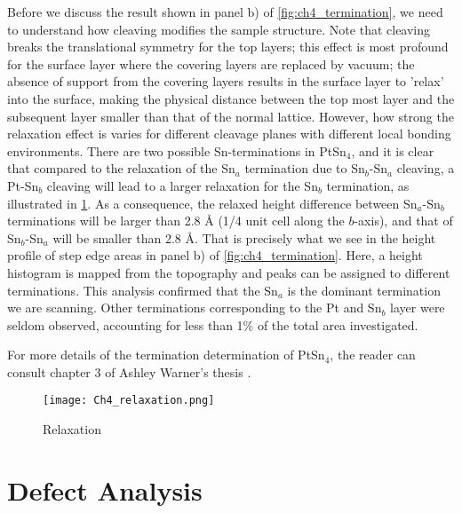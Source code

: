 Before we discuss the result shown in panel b) of \ref{fig:ch4_termination}, we need to understand how cleaving modifies the sample structure. Note that cleaving breaks the translational symmetry for the top layers; this effect is most profound for the surface layer where the covering layers are replaced by vacuum; the absence of support from the covering layers results in the surface layer to 'relax' into the surface, making the physical distance between the top most layer and the subsequent layer smaller than that of the normal lattice. However, how strong the relaxation effect is varies for different cleavage planes with different local bonding environments. There are two possible Sn-terminations in PtSn$_4$, and it is clear that compared to the relaxation of the Sn$_a$ termination due to Sn$_b$-Sn$_a$ cleaving, a Pt-Sn$_b$ cleaving will lead to a larger relaxation for the Sn$_b$ termination, as illustrated in \ref{fig:ch4_relaxation}. As a consequence, the relaxed height difference between Sn$_a$-Sn$_b$ terminations will be larger than 2.8 {\AA} (1/4 unit cell along the $b$-axis), and that of Sn$_b$-Sn$_a$ will be smaller than 2.8 {\AA}. That is precisely what we see in the height profile of step edge areas in panel b) of \ref{fig:ch4_termination}. Here, a height histogram is mapped from the topography and peaks can be assigned to different terminations. This analysis confirmed that the Sn$_a$ is the dominant termination we are scanning. Other terminations corresponding to the Pt and Sn$_b$ layer were seldom observed, accounting for less than 1\% of the total area investigated. 

\par For more details of the termination determination of PtSn$_4$, the reader can consult chapter 3 of Ashley Warner's thesis \cite{warner_defect_nodate}.

\begin{figure}
	\centering
	\texttt{[image: Ch4\_relaxation.png]}
	\caption{Relaxation}
	\label{fig:ch4_relaxation}
\end{figure}



\section{Defect Analysis}

